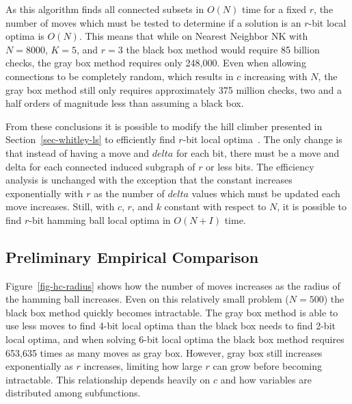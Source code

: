 As this algorithm finds all connected subsets in $O(N)$ time for a fixed $r$, the number of moves
which must be tested to determine if a solution is an $r$-bit local optima is $O(N)$. This means that
while on Nearest Neighbor NK with $N=8000$, $K=5$, and $r=3$ the black box method would require 85 billion
checks, the gray box method requires only 248,000. Even when allowing connections to be completely random,
which results in $c$ increasing with $N$, the gray box method still only requires approximately 375 million checks,
two and a half orders of magnitude less than assuming a black box.

From these conclusions it is possible to modify the hill climber presented in Section~\ref{sec-whitley-ls} to
efficiently find $r$-bit local optima~\cite{chicano:2014:ball}. The only change is that instead of having a move
and $delta$ for each bit, there must be a move and delta for each connected induced subgraph of $r$ or less bits.
The efficiency analysis is unchanged with the exception that the constant increases exponentially with $r$ as
the number of $delta$ values which must be updated each move increases. Still, with $c$, $r$, and $k$ constant
with respect to $N$, it is possible to find $r$-bit hamming ball local optima in $O(N+I)$ time.

\subsection{Preliminary Empirical Comparison}
Figure~\ref{fig-hc-radius} shows how the number of moves increases as the radius of the hamming ball increases.
Even on this relatively small problem ($N=500$) the black box method quickly becomes intractable. The gray box
method is able to use less moves to find 4-bit local optima than the black box needs to find 2-bit local optima,
and when solving 6-bit local optima the black box method requires 653,635 times as many moves as gray box. However,
gray box still increases exponentially as $r$ increases, limiting how large $r$ can grow before becoming intractable.
This relationship depends heavily on $c$ and how variables are distributed among subfunctions.

\begin{comment}
\section{Memetic Algorithms}
~\cite{chen:2011:memetic}


Local search, even $r$-bit hamming ball search, is not sufficient to robustly find global optimums on
highly multi-modal problems. This limitation was shown in Figure~\ref{fig-evals-to-success} with hill climbing
unable to reach the global optima on almost any large size problem.
\end{comment}
